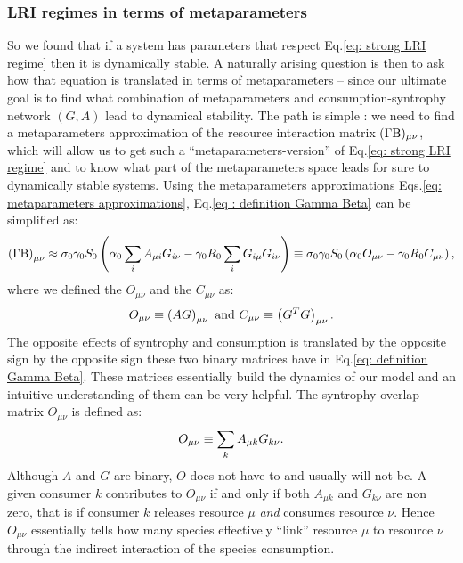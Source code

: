 \documentclass[12pt, titlepage]{report}
\begin{document}
\subsubsection{LRI regimes in terms of metaparameters}
So we found that if a system has parameters that respect Eq.\eqref{eq: strong LRI regime} then it is dynamically stable. A naturally arising question is then to ask %
how that equation is translated in terms of metaparameters -- since our ultimate goal is to find what combination of metaparameters and consumption-syntrophy network $(G,A)$ lead to dynamical stability.
The path is simple : we need to find a metaparameters approximation of the resource interaction matrix $(\Gamma\text{B})_{\mu \nu}$, which will allow us to get such a ``metaparameters-version'' of Eq.\eqref{eq: strong LRI regime} and to know what part of the metaparameters space leads for sure to dynamically stable systems.
Using the metaparameters approximations Eqs.\eqref{eq: metaparameters approximations}, Eq.\eqref{eq : definition Gamma Beta} can be simplified as:
\begin{equation}\label{eq: metaparam approximation GammaBeta}
\left(\Gamma \text{B}\right)_{\mu \nu}\approx \sigma_0 \gamma_0 S_0 \left(\alpha_0 \sum_i A_{\mu i}G_{i\nu}-\gamma_0 R_0 \sum_i G_{i\mu}G_{i\nu}\right)\equiv \sigma_0 \gamma_0 S_0 \left(\alpha_0 O_{\mu \nu}-\gamma_0R_0 C_{\mu\nu}\right),
\end{equation}
where we defined the  $O_{\mu\nu}$ and the  $C_{\mu\nu}$ as:
\begin{equation}
O_{\mu\nu} \equiv \left(AG\right)_{\mu \nu} \text{ and } C_{\mu\nu} \equiv \left(G^TG\right)_{\mu\nu}.
\end{equation}
The opposite effects of syntrophy and consumption is translated by the opposite sign by the opposite sign these two binary matrices have in Eq.\eqref{eq: definition Gamma Beta}. These matrices essentially build the dynamics of our model and an intuitive understanding of them can be very helpful.
The syntrophy overlap matrix $O_{\mu\nu}$ is defined as:
\begin{equation}
O_{\mu\nu} \equiv \sum_k A_{\mu k} G_{k\nu}.
\end{equation}
Although $A$ and $G$ are binary, $O$ does not have to and usually will not be. A given consumer $k$ contributes to $O_{\mu\nu}$ if and only if both $A_{\mu k}$ and $G_{k\nu}$ are non zero, that is if consumer $k$ releases resource $\mu$ \textit{and} consumes resource $\nu$. Hence $O_{\mu\nu}$ essentially tells how many species effectively ``link'' resource $\mu$ to resource $\nu$ through the indirect interaction of the species consumption.
\end{document}
